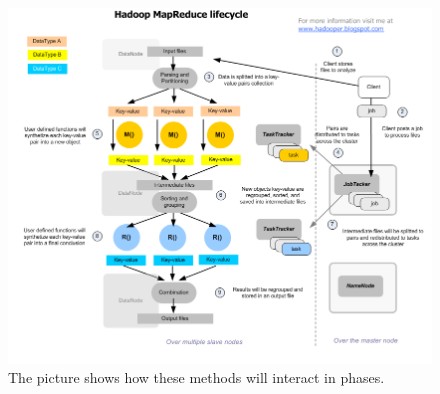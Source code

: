 \documentclass[12pt, right open]{memoir}
\begin{document}
\begin{figure}
\caption{The picture shows how these methods will interact in phases.}
\label{tab:hadoop_map_reduce_cycle}
\centering
\includegraphics[scale=.33]{HadoopMapReduceArchitecture.png}
\end{figure}
\end{document}
